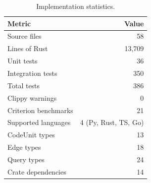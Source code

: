 \documentclass[10pt, twocolumn]{article}
\begin{document}
\begin{table}[t]
\caption{Implementation statistics.}
\label{tab:implstats}
\centering
\small
\begin{tabular}{@{}lr@{}}
\toprule
\textbf{Metric} & \textbf{Value} \\
\midrule
Source files          & 58 \\
Lines of Rust         & 13{,}709 \\
Unit tests            & 36 \\
Integration tests     & 350 \\
Total tests           & 386 \\
Clippy warnings       & 0 \\
Criterion benchmarks  & 21 \\
Supported languages   & 4 (Py, Rust, TS, Go) \\
CodeUnit types        & 13 \\
Edge types            & 18 \\
Query types           & 24 \\
Crate dependencies    & 14 \\
\bottomrule
\end{tabular}
\end{table}
\end{document}
